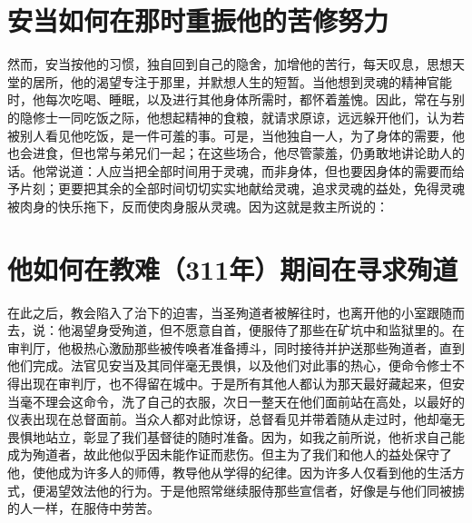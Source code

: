 
\section{安当如何在那时重振他的苦修努力}

然而，安当按他的习惯，独自回到自己的隐舍，加增他的苦行，每天叹息，思想天堂的居所，他的渴望专注于那里，并默想人生的短暂。当他想到灵魂的精神官能时，他每次吃喝、睡眠，以及进行其他身体所需时，都怀着羞愧。因此，常在与别的隐修士一同吃饭之际，他想起精神的食粮，就请求原谅，远远躲开他们，认为若被别人看见他吃饭，是一件可羞的事。可是，当他独自一人，为了身体的需要，他也会进食，但也常与弟兄们一起；在这些场合，他尽管蒙羞，仍勇敢地讲论助人的话。他常说道：人应当把全部时间用于灵魂，而非身体，但也要因身体的需要而给予片刻；更要把其余的全部时间切切实实地献给灵魂，追求灵魂的益处，免得灵魂被肉身的快乐拖下，反而使肉身服从灵魂。因为这就是救主所说的：\par


\section{他如何在教难（311年）期间在寻求殉道}

在此之后，教会陷入了治下的迫害，当圣殉道者被解往时，也离开他的小室跟随而去，说：他渴望身受殉道，但不愿意自首，便服侍了那些在矿坑中和监狱里的。在审判厅，他极热心激励那些被传唤者准备搏斗，同时接待并护送那些殉道者，直到他们完成。法官见安当及其同伴毫无畏惧，以及他们对此事的热心，便命令修士不得出现在审判厅，也不得留在城中。于是所有其他人都认为那天最好藏起来，但安当毫不理会这命令，洗了自己的衣服，次日一整天在他们面前站在高处，以最好的仪表出现在总督面前。当众人都对此惊讶，总督看见并带着随从走过时，他却毫无畏惧地站立，彰显了我们基督徒的随时准备。因为，如我之前所说，他祈求自己能成为殉道者，故此他似乎因未能作证而悲伤。但主为了我们和他人的益处保守了他，使他成为许多人的师傅，教导他从学得的纪律。因为许多人仅看到他的生活方式，便渴望效法他的行为。于是他照常继续服侍那些宣信者，好像是与他们同被掳的人一样，在服侍中劳苦。\par


